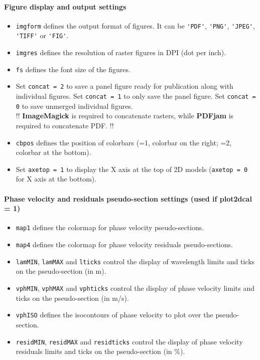 \documentclass[twoside,a4paper]{article}
\def\ImageMagick{\textbf{ImageMagick}}
\def\PDFjam{\textbf{PDFjam}}
\begin{document}
\paragraph{Figure display and output settings}
\begin{itemize}[leftmargin=*]
\setlength\itemsep{2ex}
\item \verb|imgform| defines the output format of figures. It can be \verb|'PDF'|, \verb|'PNG'|, \verb|'JPEG'|, \verb|'TIFF'| or \verb|'FIG'|.

\item \verb|imgres| defines the resolution of raster figures in DPI (dot per inch).

\item \verb|fs| defines the font size of the figures.

\item Set \verb|concat = 2| to save a panel figure ready for publication along with individual figures. Set \verb|concat = 1| to only save the panel figure. Set \verb|concat = 0| to save unmerged individual figures.\\[1ex]
!! {\ImageMagick} is required to concatenate rasters, while {\PDFjam} is required to concatenate PDF. !!

\item \verb|cbpos| defines the position of colorbars (=1, colorbar on the right; =2, colorbar at the bottom).

\item Set \verb|axetop = 1| to display the X axis at the top of 2D models (\verb|axetop = 0| for X axis at the bottom).
\end{itemize}

\paragraph{Phase velocity and residuals pseudo-section settings (used if plot2dcal = 1)}
\begin{itemize}[leftmargin=*]
\setlength\itemsep{2ex}
\item \verb|map1| defines the colormap for phase velocity pseudo-sections.

\item \verb|map4| defines the colormap for phase velocity residuals pseudo-sections.

\item \verb|lamMIN|, \verb|lamMAX| and \verb|lticks| control the display of wavelength limits and ticks on the pseudo-section (in m).

\item \verb|vphMIN|, \verb|vphMAX| and \verb|vphticks| control the display of phase velocity limits and ticks on the pseudo-section (in m/s).

\item \verb|vphISO| defines the isocontours of phase velocity to plot over the pseudo-section.

\item \verb|residMIN|, \verb|residMAX| and \verb|residticks| control the display of phase velocity residuals limits and ticks on the pseudo-section (in \%).
\end{itemize}
\end{document}
